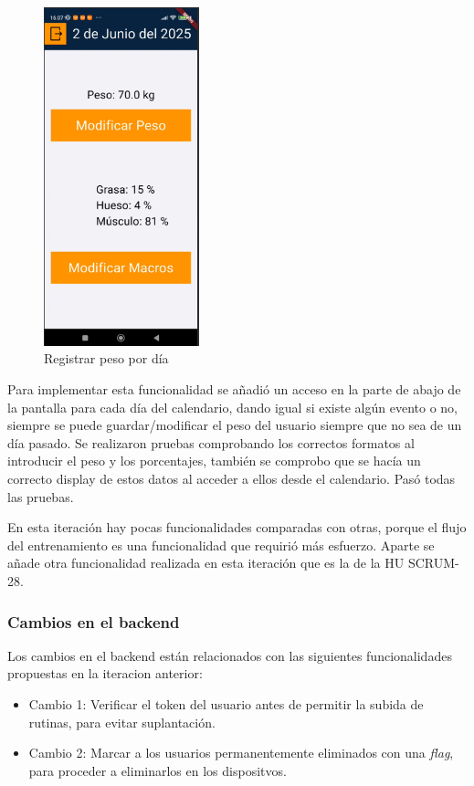 \begin{figure}[H]
   \centering
    \includegraphics[width=0.4\textwidth]{pantallas/RegistrarPeso.png}
    \caption{Registrar peso por día}
    \label{fig:RegistrarPeso}
\end{figure}

Para implementar esta funcionalidad se añadió un acceso en la parte de abajo de la pantalla para cada día del calendario, dando igual si existe algún evento o no, siempre se puede guardar/modificar el peso del usuario siempre que no sea de un día pasado. Se realizaron pruebas comprobando los correctos formatos al introducir el peso y los porcentajes, también se comprobo que se hacía un correcto display de estos datos al acceder a ellos desde el calendario. Pasó todas las pruebas.

En esta iteración hay pocas funcionalidades comparadas con otras, porque el flujo del entrenamiento es una funcionalidad que requirió más esfuerzo. Aparte se añade otra funcionalidad realizada en esta iteración que es la de la HU SCRUM-28.

\subsubsection{Cambios en el backend}

Los cambios en el backend están relacionados con las siguientes funcionalidades propuestas en la iteracion anterior:

\begin{itemize}
	\item Cambio 1: Verificar el token del usuario antes de permitir la subida de rutinas, para evitar suplantación.
  	\item Cambio 2: Marcar a los usuarios permanentemente eliminados con una \textit{flag}, para proceder a eliminarlos en los dispositvos.
\end{itemize}

